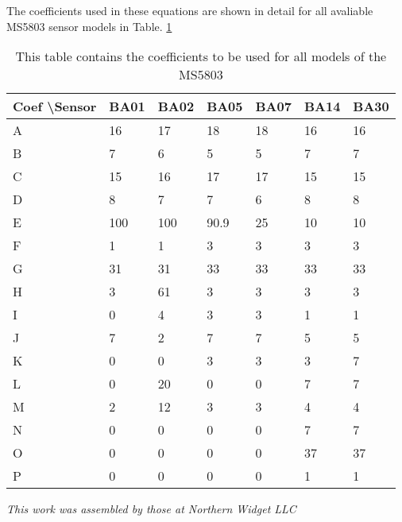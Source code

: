 \documentclass[10pt,a4paper]{report}
\begin{document}
\newpage
The coefficients used in these equations are shown in detail for all avaliable MS5803 sensor models in Table. \ref{tab:Coef}

\begin{table}[!h]
\centering


\begin{tabular}{|l|l|l|l|l|l|l|}
\hline
Coef \textbackslash Sensor & BA01 & BA02 & BA05 & BA07 & BA14 & BA30 \\ \hline
A           & 16   & 17   & 18   & 18   & 16   & 16   \\ \hline
B           & 7    & 6    & 5    & 5    & 7    & 7    \\ \hline
C           & 15   & 16   & 17   & 17   & 15   & 15   \\ \hline
D           & 8    & 7    & 7    & 6    & 8    & 8    \\ \hline
E           & 100  & 100  & 90.9 & 25   & 10   & 10   \\ \hline
F           & 1    & 1    & 3    & 3    & 3    & 3    \\ \hline
G           & 31   & 31   & 33   & 33   & 33   & 33   \\ \hline
H           & 3    & 61   & 3    & 3    & 3    & 3    \\ \hline
I           & 0    & 4    & 3    & 3    & 1    & 1    \\ \hline
J           & 7    & 2    & 7    & 7    & 5    & 5    \\ \hline
K           & 0    & 0    & 3    & 3    & 3    & 7    \\ \hline
L           & 0    & 20   & 0    & 0    & 7    & 7    \\ \hline
M           & 2    & 12   & 3    & 3    & 4    & 4    \\ \hline
N           & 0    & 0    & 0    & 0    & 7    & 7    \\ \hline
O           & 0    & 0    & 0    & 0    & 37   & 37   \\ \hline
P           & 0    & 0    & 0    & 0    & 1    & 1    \\ \hline
\end{tabular}

\caption{This table contains the coefficients to be used for all models of the MS5803}
\label{tab:Coef}
\end{table}


\vspace*{\fill}
\begin{center}
\textit{This work was assembled by those at Northern Widget LLC}
\end{center}
\end{document}
